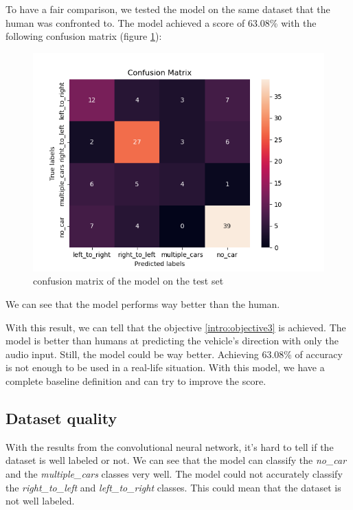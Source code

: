 To have a fair comparison, we tested the model on the same dataset that the human was confronted to. The model achieved a score of 63.08\% with the following confusion matrix (figure \ref{fig:model_score_only_audio}):

\begin{figure}[H]
    \centering
    \includegraphics[width=1\textwidth]{images/model_score_only_audio.png}
    \caption{confusion matrix of the model on the test set}
    \label{fig:model_score_only_audio}
\end{figure}

We can see that the model performs way better than the human. 

With this result, we can tell that the objective \ref{intro:objective3} is achieved. The model is better than humans at predicting the vehicle's direction with only the audio input. Still, the model could be way better. Achieving 63.08\% of accuracy is not enough to be used in a real-life situation. With this model, we have a complete baseline definition and can try to improve the score.

\subsection{Dataset quality}

With the results from the convolutional neural network, it's hard to tell if the dataset is well labeled or not. We can see that the model can classify the \textit{no\_car} and the \textit{multiple\_cars} classes very well. The model could not accurately classify the \textit{right\_to\_left} and \textit{left\_to\_right} classes. This could mean that the dataset is not well labeled.

